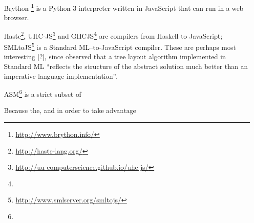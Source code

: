 Brython \footnote{\url{http://www.brython.info/}} is a Python 3 interpreter written in JavaScript that can run in a web browser. 

Haste\footnote{\url{http://haste-lang.org/}}, UHC-JS\footnote{\url{http://uu-computerscience.github.io/uhc-js/}}
and GHCJS\footnote{} are compilers from Haskell to JavaScript;
SMLtoJS\footnote{\url{http://www.smlserver.org/smltojs/}} is a Standard ML--to-JavaScript compiler.
These are perhaps most interesting [?], since \citet{kennedyfuntrees} observed that a tree layout algorithm implemented in Standard ML ``reflects the structure of the abstract solution much better than an imperative language implementation''.

ASM\footnote{} is a strict subset of 

Because the, and in order to take advantage



